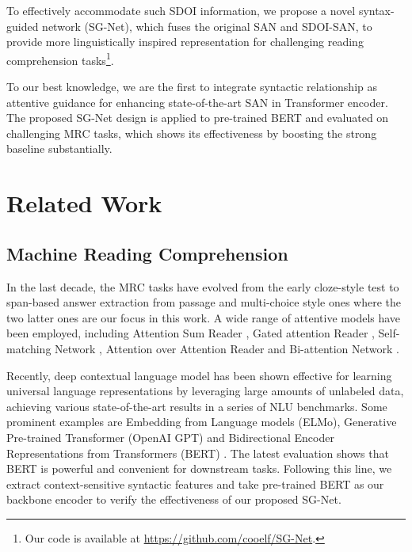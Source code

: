 \documentclass[letterpaper]{article} \usepackage{color}
\begin{document}
To effectively accommodate such SDOI information, we propose a novel syntax-guided network (SG-Net), which fuses the original SAN and SDOI-SAN, to provide more linguistically inspired representation for challenging reading comprehension tasks\footnote{Our code is available at \url{https://github.com/cooelf/SG-Net}.}. 

To our best knowledge, we are the first to integrate syntactic relationship as attentive guidance for enhancing state-of-the-art SAN in Transformer encoder. The proposed SG-Net design is applied to pre-trained BERT \cite{devlin2018bert} and evaluated on challenging MRC tasks, which shows its effectiveness by boosting the strong baseline substantially.



\section{Related Work}
\subsection{Machine Reading Comprehension}
In the last decade, the MRC tasks have evolved from the early cloze-style test \cite{hill2015goldilocks,hermann2015teaching} to span-based answer extraction from passage \cite{Rajpurkar2016SQuAD,Nguyen2016MS,Joshi2017TriviaQA,Rajpurkar2018Know} and multi-choice style ones \cite{lai2017race} where the two latter ones are our focus in this work. A wide range of attentive models have been employed, including Attention Sum Reader \cite{kadlec2016text}, Gated attention Reader \cite{Dhingra2017Gated}, Self-matching Network \cite{Wang2017Gated}, Attention over Attention Reader \cite{Cui2017Attention} and Bi-attention Network \cite{Seo2016Bidirectional}.

Recently, deep contextual language model has been shown effective for learning universal language representations by leveraging large amounts of unlabeled data, achieving various state-of-the-art results in a series of NLU benchmarks. Some prominent examples are Embedding from Language models (ELMo), Generative Pre-trained Transformer (OpenAI GPT)  \cite{radford2018improving} and Bidirectional Encoder Representations from Transformers (BERT) \cite{devlin2018bert}. The latest evaluation shows that BERT is powerful and convenient for downstream tasks. Following this line, we extract context-sensitive syntactic features and take pre-trained BERT as our backbone encoder to verify the effectiveness of our proposed SG-Net.
\end{document}
